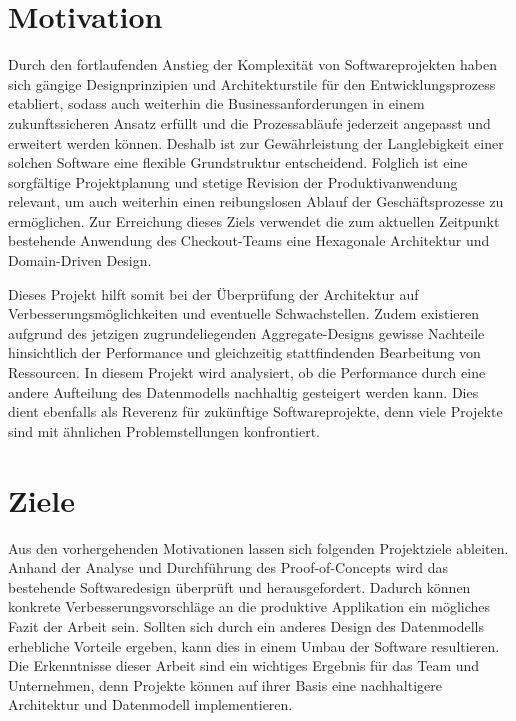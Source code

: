 \section{Motivation}

Durch den fortlaufenden Anstieg der Komplexität von Softwareprojekten \cite{Darcy.2010} haben sich gängige Designprinzipien und Architekturstile für den Entwicklungsprozess etabliert, sodass auch weiterhin die Businessanforderungen in einem zukunftssicheren Ansatz erfüllt und die Prozessabläufe jederzeit angepasst und erweitert werden können. Deshalb ist zur Gewährleistung der Langlebigkeit einer solchen Software eine flexible Grundstruktur entscheidend. Folglich ist eine sorgfältige Projektplanung und stetige Revision der Produktivanwendung relevant, um auch weiterhin einen reibungslosen Ablauf der Geschäftsprozesse zu ermöglichen. Zur Erreichung dieses Ziels verwendet die zum aktuellen Zeitpunkt bestehende Anwendung des Checkout-Teams eine Hexagonale Architektur und Domain-Driven Design.

Dieses Projekt hilft somit bei der Überprüfung der Architektur auf Verbesserungsmöglichkeiten und eventuelle Schwachstellen. Zudem existieren aufgrund des jetzigen zugrundeliegenden Aggregate-Designs gewisse Nachteile hinsichtlich der Performance und gleichzeitig stattfindenden Bearbeitung von Ressourcen. In diesem Projekt wird analysiert, ob die Performance durch eine andere Aufteilung des Datenmodells nachhaltig gesteigert werden kann. Dies dient ebenfalls als Reverenz für zukünftige Softwareprojekte, denn viele Projekte sind mit ähnlichen Problemstellungen konfrontiert.



\section{Ziele}

Aus den vorhergehenden Motivationen lassen sich folgenden Projektziele ableiten. Anhand der Analyse und Durchführung des Proof-of-Concepts wird das bestehende Softwaredesign überprüft und herausgefordert. Dadurch können konkrete Verbesserungsvorschläge an die produktive Applikation ein mögliches Fazit der Arbeit sein. Sollten sich durch ein anderes Design des Datenmodells erhebliche Vorteile ergeben, kann dies in einem Umbau der Software resultieren. Die Erkenntnisse dieser Arbeit sind ein wichtiges Ergebnis für das Team und Unternehmen, denn Projekte können auf ihrer Basis eine nachhaltigere Architektur und Datenmodell implementieren.
